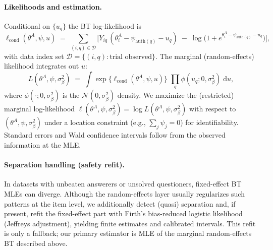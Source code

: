\documentclass{article} %
\begin{document}
\paragraph{Likelihoods and estimation.}
Conditional on $\{u_q\}$ the BT log-likelihood is
\begin{equation}
\ell_{\text{cond}}(\theta^A,\psi,u) \;=\; \sum_{(i,q)\in \mathcal D} \Big[ Y_{iq}\,(\theta^A_i-\psi_{\mathrm{auth}(q)}-u_q) \;-\; \log\!\big(1+e^{\theta^A_i-\psi_{\mathrm{auth}(q)}-u_q}\big) \Big],
\end{equation}
with data index set $\mathcal D=\{(i,q):\text{trial observed}\}$. The marginal (random-effects) likelihood integrates out $u$:
\begin{equation}
L(\theta^A,\psi,\sigma_\beta^2)
\;=\;
\int 
\exp\!\big\{\ell_{\text{cond}}(\theta^A,\psi,u)\big\}
\;\prod_{q}\phi(u_q;0,\sigma_\beta^2)\; \mathrm du,
\end{equation}
where $\phi(\cdot;0,\sigma_\beta^2)$ is the $\mathcal N(0,\sigma_\beta^2)$ density. We maximize the (restricted) marginal log-likelihood 
$\ell(\theta^A,\psi,\sigma_\beta^2)=\log L(\theta^A,\psi,\sigma_\beta^2)$ 
with respect to $(\theta^A,\psi,\sigma_\beta^2)$ under a location constraint (e.g., $\sum_{j}\psi_j=0$) for identifiability. %
Standard errors and Wald confidence intervals follow from the observed information at the MLE.

\paragraph{Separation handling (safety refit).}
In datasets with unbeaten answerers or unsolved questioners, fixed-effect BT MLEs can diverge. Although the random-effects layer usually regularizes such patterns at the item level, we additionally detect (quasi) separation and, if present, refit the fixed-effect part with Firth's bias-reduced logistic likelihood (Jeffreys adjustment), yielding finite estimates and calibrated intervals. This refit is only a fallback; our primary estimator is MLE of the marginal random-effects BT described above.
\end{document}
